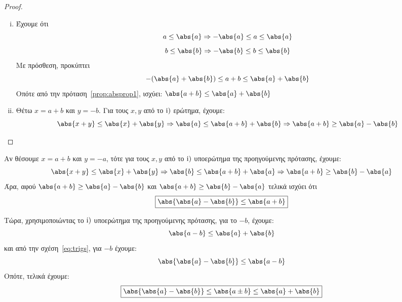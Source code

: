 \documentclass[main.tex]{subfiles}
\begin{document}

\begin{proof}
\item {}
  \begin{enumerate}[(i)]
    \item Έχουμε ότι 
      \[ 
        a \leq \abs{a} \Rightarrow - \abs{a} \leq a \leq \abs{a}
      \] 
      \[
        b \leq \abs{b} \Rightarrow - \abs{b} \leq b \leq \abs{b} 
      \] 
      Με πρόσθεση, προκύπτει
      \[
        - (\abs{a} + \abs{b} ) \leq a + b \leq \abs{a} + \abs{b} 
      \] 
      Οπότε από την πρόταση~\ref{prop:absprop1}, ισχύει:
      $ \abs{a+b} \leq \abs{a} + \abs{b} $
    \item Θέτω $ x = a+b $ και $ y = -b $. Για τους $ x,y $ από το $ \rm{i}) $ 
      ερώτημα, έχουμε:
      \[
        \abs{x+y} \leq \abs{x} + \abs{y} \Rightarrow \abs{a} \leq 
        \abs{a+b} + \abs{b} \Rightarrow \abs{a+b} \geq \abs{a} - \abs{b}
      \] 
  \end{enumerate} 
\end{proof} 

\begin{rem}
  Αν θέσουμε $ x = a+b $ και $ y = -a $, τότε για τους $ x,y $ από το $ \rm{i)} $ 
  υποερώτημα της προηγούμενης πρότασης, έχουμε:
  \[
    \abs{x+y} \leq \abs{x} + \abs{y} \Rightarrow \abs{b} \leq 
    \abs{a+b} + \abs{a} \Rightarrow \abs{a+b} \geq \abs{b} - \abs{a} 
  \] 
  Άρα, αφού $ \abs{a+b} \geq \abs{a} - \abs{b} $ και 
  $ \abs{a+b} \geq \abs{b} - \abs{a} $ τελικά ισχύει ότι
  \begin{equation}\label{eq:trigs} 
    \boxed{\abs{\abs{a} - \abs{b}} \leq \abs{a+b}}
  \end{equation}

  Τώρα, χρησιμοποιώντας το $ \rm{i)} $ υποερώτημα της προηγούμενης πρότασης, για το 
  $ -b $, έχουμε:
  \[
    \abs{a-b} \leq \abs{a} + \abs{b} 
  \] 
  και από την σχέση~\eqref{eq:trigs}, για $-b$ έχουμε:
  \[
    \abs{\abs{a} - \abs{b}} \leq \abs{a-b} 
  \]
  Οπότε, τελικά έχουμε:
  \[
    \boxed{\abs{\abs{a} - \abs{b}} \leq \abs{a \pm b} \leq \abs{a} + \abs{b}  }
  \]
\end{rem}
\end{document}
